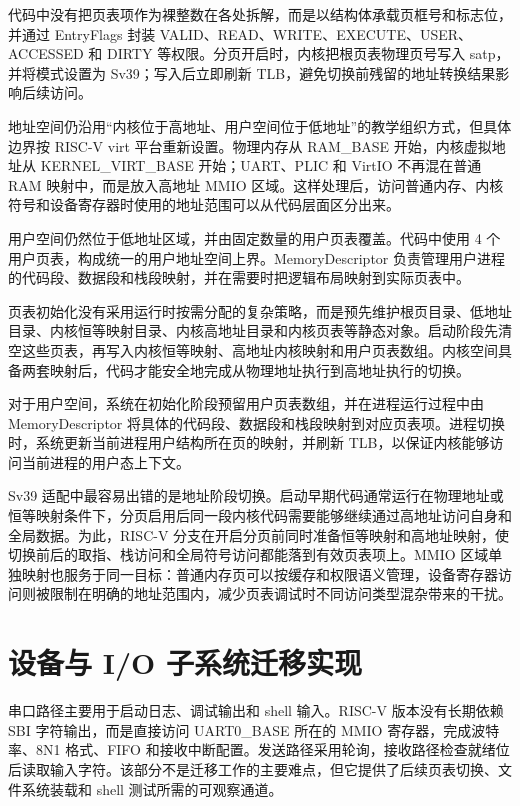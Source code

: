 代码中没有把页表项作为裸整数在各处拆解，而是以结构体承载页框号和标志位，并通过 EntryFlags 封装 VALID、READ、WRITE、EXECUTE、USER、ACCESSED 和 DIRTY 等权限。分页开启时，内核把根页表物理页号写入 satp，并将模式设置为 Sv39；写入后立即刷新 TLB，避免切换前残留的地址转换结果影响后续访问。

地址空间仍沿用“内核位于高地址、用户空间位于低地址”的教学组织方式，但具体边界按 RISC-V virt 平台重新设置。物理内存从 RAM\_BASE 开始，内核虚拟地址从 KERNEL\_VIRT\_BASE 开始；UART、PLIC 和 VirtIO 不再混在普通 RAM 映射中，而是放入高地址 MMIO 区域。这样处理后，访问普通内存、内核符号和设备寄存器时使用的地址范围可以从代码层面区分出来。

用户空间仍然位于低地址区域，并由固定数量的用户页表覆盖。代码中使用 4 个用户页表，构成统一的用户地址空间上界。MemoryDescriptor 负责管理用户进程的代码段、数据段和栈段映射，并在需要时把逻辑布局映射到实际页表中。

页表初始化没有采用运行时按需分配的复杂策略，而是预先维护根页目录、低地址目录、内核恒等映射目录、内核高地址目录和内核页表等静态对象。启动阶段先清空这些页表，再写入内核恒等映射、高地址内核映射和用户页表数组。内核空间具备两套映射后，代码才能安全地完成从物理地址执行到高地址执行的切换。

对于用户空间，系统在初始化阶段预留用户页表数组，并在进程运行过程中由 MemoryDescriptor 将具体的代码段、数据段和栈段映射到对应页表项。进程切换时，系统更新当前进程用户结构所在页的映射，并刷新 TLB，以保证内核能够访问当前进程的用户态上下文。

Sv39 适配中最容易出错的是地址阶段切换。启动早期代码通常运行在物理地址或恒等映射条件下，分页启用后同一段内核代码需要能够继续通过高地址访问自身和全局数据。为此，RISC-V 分支在开启分页前同时准备恒等映射和高地址映射，使切换前后的取指、栈访问和全局符号访问都能落到有效页表项上。MMIO 区域单独映射也服务于同一目标：普通内存页可以按缓存和权限语义管理，设备寄存器访问则被限制在明确的地址范围内，减少页表调试时不同访问类型混杂带来的干扰。

\section{设备与 I/O 子系统迁移实现}

串口路径主要用于启动日志、调试输出和 shell 输入。RISC-V 版本没有长期依赖 SBI 字符输出，而是直接访问 UART0\_BASE 所在的 MMIO 寄存器，完成波特率、8N1 格式、FIFO 和接收中断配置。发送路径采用轮询，接收路径检查就绪位后读取输入字符。该部分不是迁移工作的主要难点，但它提供了后续页表切换、文件系统装载和 shell 测试所需的可观察通道。

